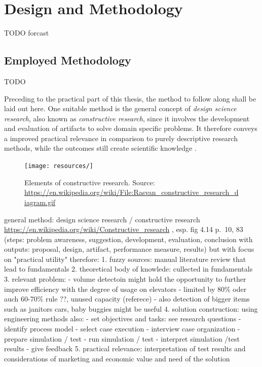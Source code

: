 \chapter{Design and Methodology}
\label{chap:design}
TODO forcast



\section{Employed Methodology}
TODO

Preceding to the practical part of this thesis, 
the method to follow along shall be laid out here.
One suitable method is the general concept of \emph{design science research}, also known as \emph{constructive research}, 
since it involves the development and evaluation of artifacts to solve domain specific problems.
It therefore conveys a improved practical relevance in comparison to purely descriptive research methods,
while the outcomes still create scientific knowledge
\autocite[][p.~v]{dresh2015designresearch}.

\begin{figure}[hbt]
	\centering
	\texttt{[image: resources/]}
	\caption{\label{fig:design:designscience} Elements of constructive research. Source:
	\url{https://en.wikipedia.org/wiki/File:Rasvan_constructive_research_diagram.gif}}
\end{figure}



general method:
design science research / constructive research
\url{https://en.wikipedia.org/wiki/Constructive_research}
\autocite[][pp.67--100]{dresh2015designresearch}, esp. fig 4.14 p.~10, 83 (steps: problem awareness, suggestion, development, evaluation, conclusion with outputs: proposal, design, artifact, performance measure, results)
but with focus on "practical utility"
therefore:
1. fuzzy sources: manual literature review that lead to fundamentals
2. theoretical body of knowlede: cullected in fundamentals
3. relevant problem: 
    - volume detectoin might hold the opportunity to further improve efficiency with the degree of usage on elevators
    - limited by 80\% oder auch 60-70\% rule \autocite[][p.~194]{unger2015aufzuege} ??, unused capacity (referece)
    - also detection of bigger items such as janitors cars, baby buggies  might be useful
4. solution construction: using engineering methods
    also:    
    - set objectives and tasks: see research questions
    - identify process model
    - select case execution
    - interview case organization
    - prepare simulation / test
    - run simulation / test
    - interpret simulation /test results
    - give feedback
5. practical relevance: interpretation of test results and considerations of marketing and economic value and need of the solution

